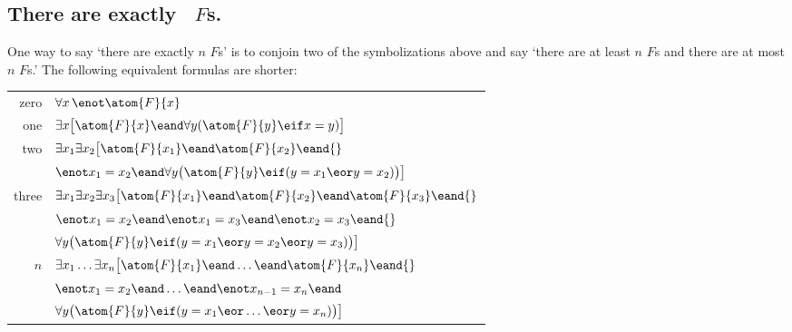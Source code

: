 \subsection*{There are exactly \blank\ $F$s.}
\label{summary.exactly}

One way to say `there are exactly $n$ $F$s' is to conjoin two of the symbolizations above and say `there are at least $n$ $F$s and there are at most $n$ $F$s.' The following equivalent formulas are shorter:
\begin{tabular*}{\textwidth}{rl}
zero & $\forall x\,\enot \atom{F}{x}$\\
one & $\exists x\bigl[\atom{F}{x} \eand \forall y(\atom{F}{y} \eif x = y)\bigr]$\\
two & $\exists x_1\exists x_2\bigl[\atom{F}{x_1} \eand \atom{F}{x_2} \eand {}$\\
& $\enot x_1 = x_2 \eand \forall y\bigl(\atom{F}{y} \eif (y= x_1 \eor y = x_2)\bigr) \bigr]$\\
three & $\exists x_1\exists x_2\exists x_3\bigl[\atom{F}{x_1} \eand \atom{F}{x_2} \eand \atom{F}{x_3} \eand {}$\\
& $\enot x_1 =  x_2 \eand \enot  x_1 = x_3 \eand \enot x_2 = x_3 \eand {}$\\
& $\forall y\bigl(\atom{F}{y} \eif (y = x_1 \eor y = x_2 \eor y =  x_3)\bigr) \bigr]$\\
$n$ & $\exists x_1\ldots\exists x_n\bigl[\atom{F}{x_1} \eand\ldots\eand \atom{F}{x_n}  \eand {}$\\
&$ \enot x_1 = x_2 \eand\ldots\eand \enot x_{n-1}= x_n \eand \phantom{.}$\\
& $\forall y\bigl(\atom{F}{y} \eif (y= x_1 \eor \ldots \eor y= x_n)\bigr)\bigr]$ 
\end{tabular*}


